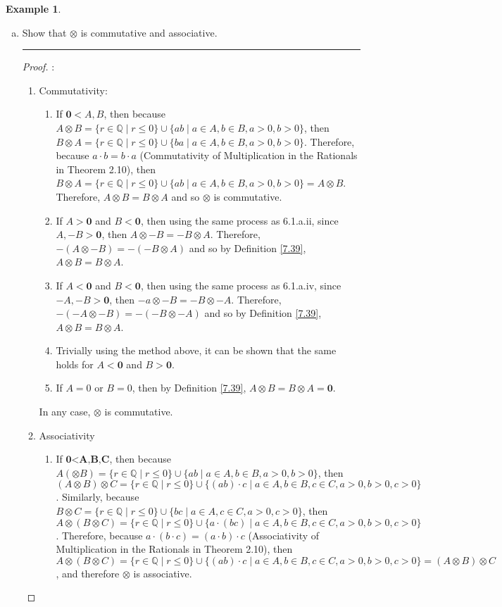 \documentclass[openany, amssymb, psamsfonts]{amsart}
\newcommand{\bbQ}{\mathbb{Q}}
\theoremstyle{definition}
\newtheorem{exmp}{Example}[section]
\numberwithin{equation}{section}
\begin{document}
\begin{exmp}
\begin{enumerate}[(a)]
		\item Show that $\otimes$ is commutative and associative.
\vspace{4pt}     \hrule   \vspace{4pt}
\begin{proof}:\\
\begin{enumerate}
    \item Commutativity:
    \begin{enumerate}
        \item If $\textbf{0}<A,B$, then because $A\otimes B = \{r \in \bbQ \mid r \leq 0\} \cup \{ab \mid a\in A, b\in B, a > 0, b > 0\}$, then $B\otimes A = \{r \in \bbQ \mid r \leq 0\} \cup \{ba \mid a\in A, b\in B, a > 0, b > 0\}$. Therefore, because $a\cdot b = b\cdot a$ (Commutativity of Multiplication in the Rationals in Theorem 2.10), then $B\otimes A = \{r \in \bbQ \mid r \leq 0\} \cup \{ab \mid a\in A, b\in B, a > 0, b > 0\} = A\otimes B$. Therefore, $A\otimes B = B\otimes A$ and so $\otimes$ is commutative.  
        \item If $A> \textbf{0}$ and $B < \textbf{0}$, then using the same process as 6.1.a.ii, since $A, -B > \textbf{0}$, then $A \otimes -B = -B \otimes A$. Therefore, $-(A \otimes -B) = -(-B \otimes A)$ and so by Definition \ref{7.39}, $A\otimes B = B\otimes A$.
        \item If $A< \textbf{0}$ and $B< \textbf{0}$, then using the same process as 6.1.a.iv, since $-A, -B > \textbf{0}$, then $-a \otimes -B = -B \otimes -A$. Therefore, $-(-A \otimes -B) = -(-B \otimes -A)$ and so by Definition \ref{7.39}, $A\otimes B = B\otimes A$.
        \item Trivially using the method above, it can be shown that the same holds for $A< \textbf{0}$ and $B > \textbf{0}$.
        \item If $A=0$ or $B=0$, then by Definition \ref{7.39}, $A\otimes B = B\otimes A = \textbf{0}$.
    \end{enumerate}
    In any case, $\otimes$ is commutative.
    \item Associativity
    \begin{enumerate}
        \item If $\textbf{0<A,B,C}$, then because $A(\otimes B) = \{r \in \bbQ \mid r \leq 0\} \cup \{ab \mid a\in A, b\in B, a > 0, b > 0\}$, then $(A\otimes B)\otimes C = \{r \in \bbQ \mid r \leq 0\} \cup \{(ab)\cdot c \mid a\in A, b\in B, c\in C, a > 0, b > 0, c>0\}$. Similarly, because $B\otimes C = \{r \in \bbQ \mid r \leq 0\} \cup \{bc \mid a\in A, c\in C, a > 0, c > 0\}$, then $A\otimes (B\otimes C) = \{r \in \bbQ \mid r \leq 0\} \cup \{a\cdot (bc) \mid a\in A, b\in B, c\in C, a > 0, b > 0, c>0\}$. Therefore, because $a\cdot (b\cdot c) = (a\cdot b)\cdot c$ (Associativity of Multiplication in the Rationals in Theorem 2.10), then $A\otimes (B\otimes C) = \{r \in \bbQ \mid r \leq 0\} \cup \{(ab)\cdot c \mid a\in A, b\in B, c\in C, a > 0, b > 0, c>0\} = (A\otimes B)\otimes C$, and therefore $\otimes$ is associative.

\end{enumerate}
\end{enumerate}
\end{proof}
\end{enumerate}
\end{exmp}
\end{document}
